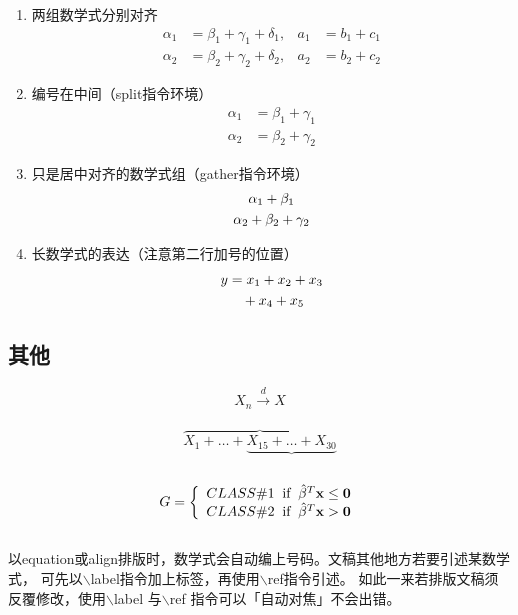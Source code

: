 \begin{enumerate}
    \item 两组数学式分别对齐
    \begin{align}
        \alpha_1 &= \beta_1+\gamma_1+\delta_1, &a_1 &= b_1+c_1\\
        \alpha_2 &= \beta_2+\gamma_2+\delta_2, &a_2 &= b_2+c_2
    \end{align}

    \item 编号在中间（split指令环境）
        \begin{equation}
            \begin{split}
                \alpha_1 &= \beta_1+\gamma_1\\
                \alpha_2 &= \beta_2+\gamma_2
            \end{split}
        \end{equation}
    \item 只是居中对齐的数学式组（gather指令环境）
        \begin{gather}
        \alpha_1 + \beta_1\notag\\
        \alpha_2 + \beta_2 + \gamma_2\notag
        \end{gather}

    \item 长数学式的表达（注意第二行加号的位置）
        \begin{align}
            y   &= x_1 + x_2 + x_3 \notag\\
                &\quad + x_4 + x_5
        \end{align}
\end{enumerate}


\subsection{其他}

  $$X_{n} \stackrel{d}{\longrightarrow} X$$\\
  $$\overbrace{X_{1} + \ldots + \underbrace{X_{15} + \ldots + X_{30}}}$$\\
  \begin{equation*}
    G = \left\{\begin{array}{l}
          CLASS\#1 \;\;\mbox{if} \;\; \hat{\beta}^T\bf{x} \leq 0 \\
          CLASS\#2 \;\;\mbox{if} \;\; \hat{\beta}^T\bf{x} > 0
        \end{array}\right.
  \end{equation*}\\

以equation或align排版时，数学式会自动编上号码。文稿其他地方若要引述某数学式，
可先以$\backslash$label指令加上标签，再使用$\backslash$ref指令引述。
如此一来若排版文稿须反覆修改，使用$\backslash$label 与$\backslash$ref 指令可以「自动对焦」不会出错。
